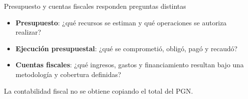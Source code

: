 \begin{frame}{Presupuesto y cuentas fiscales responden preguntas distintas}
\begin{itemize}
  \item \textbf{Presupuesto}: ¿qué recursos se estiman y qué operaciones se autoriza realizar?
  \item \textbf{Ejecución presupuestal}: ¿qué se comprometió, obligó, pagó y recaudó?
  \item \textbf{Cuentas fiscales}: ¿qué ingresos, gastos y financiamiento resultan bajo una metodología y cobertura definidas?
\end{itemize}
\vspace{0.7em}
La contabilidad fiscal no se obtiene copiando el total del PGN.
\fuenteCaja
\end{frame}
